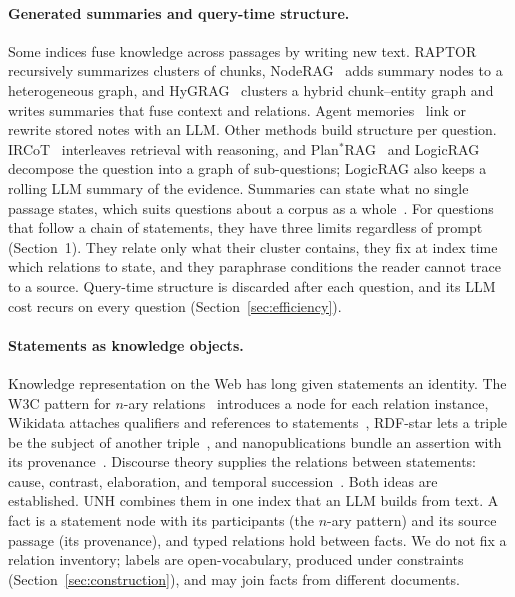 \documentclass[sigconf, review, anonymous]{acmart}
\newcommand{\sys}{UNH}
\begin{document}
\paragraph{Generated summaries and query-time structure.}
Some indices fuse knowledge across passages by writing new text. RAPTOR~\cite{sarthi2024raptor} recursively summarizes clusters of chunks, NodeRAG~\cite{xu2025noderag} adds summary nodes to a heterogeneous graph, and HyGRAG~\cite{zhong2026hygrag} clusters a hybrid chunk--entity graph and writes summaries that fuse context and relations. Agent memories~\cite{xu2025amem,qian2024memorag} link or rewrite stored notes with an LLM. Other methods build structure per question. IRCoT~\cite{trivedi2023interleaving} interleaves retrieval with reasoning, and Plan$^{*}$RAG~\cite{verma2025planrag} and LogicRAG~\cite{chen2026logicrag} decompose the question into a graph of sub-questions; LogicRAG also keeps a rolling LLM summary of the evidence. Summaries can state what no single passage states, which suits questions about a corpus as a whole~\cite{edge2024local}. For questions that follow a chain of statements, they have three limits regardless of prompt (Section~1). They relate only what their cluster contains, they fix at index time which relations to state, and they paraphrase conditions the reader cannot trace to a source. Query-time structure is discarded after each question, and its LLM cost recurs on every question (Section~\ref{sec:efficiency}).

\paragraph{Statements as knowledge objects.}
Knowledge representation on the Web has long given statements an identity. The W3C pattern for $n$-ary relations~\cite{noy2006nary} introduces a node for each relation instance, Wikidata attaches qualifiers and references to statements~\cite{vrandecic2014wikidata}, RDF-star lets a triple be the subject of another triple~\cite{hartig2017rdfstar}, and nanopublications bundle an assertion with its provenance~\cite{groth2010nanopub}. Discourse theory supplies the relations between statements: cause, contrast, elaboration, and temporal succession~\cite{mann1988rhetorical,prasad2017penn}. Both ideas are established. \sys{} combines them in one index that an LLM builds from text. A fact is a statement node with its participants (the $n$-ary pattern) and its source passage (its provenance), and typed relations hold between facts. We do not fix a relation inventory; labels are open-vocabulary, produced under constraints (Section~\ref{sec:construction}), and may join facts from different documents.
\end{document}
